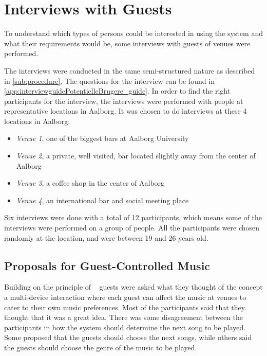 \section{Interviews with Guests}
\label{userInterviews}

To understand which types of persons could be interested in using the system and what their requirements would be, some interviews with guests of venues were performed.

The interviews were conducted in the same semi-structured nature as described in \cref{sub:procedure}. The questions for the interview can be found in \cref{app:interviewguidePotentielleBrugere_guide}. In order to find the right participants for the interview, the interviews were performed with people at representative locations in Aalborg. It was chosen to do interviews at these 4 locations in Aalborg:

\begin{itemize}
    \item \emph{Venue 1}, one of the biggest bars at Aalborg University
    \item \emph{Venue 2}, a private, well visited, bar located slightly away from the center of Aalborg
    \item \emph{Venue 3}, a coffee shop in the center of Aalborg
    \item \emph{Venue 4}, an international bar and social meeting place
\end{itemize}

Six interviews were done with a total of 12 participants, which means
some of the interviews were performed on a group of people. All the
participants were chosen randomly at the location, and were between 19 and 26 years old.

\subsection{Proposals for Guest-Controlled Music}
\label{ProposalsForGuestControlledMusic}
Building on the principle of ~\cite{sorensen2012} guests were asked what they thought of the concept a multi-device interaction where each guest can affect the music at venues to cater to their own music preferences. Most of the participants said that they thought that it was a great idea. There was some disagreement between the participants in how the system should determine the next song to be played. Some proposed that the guests should choose the next songs, while others said the guests should choose the genre of the music to be played.

